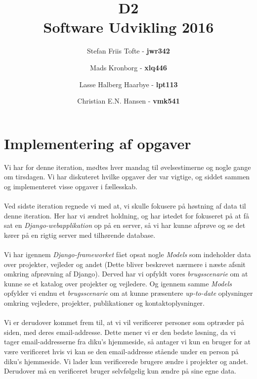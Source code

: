 \documentclass[11pt]{article}
\title{
  \vspace{3cm}
  \Huge{D2} \\
  \Large{Software Udvikling 2016}
}
\author{
	\Large{Stefan Friis Tofte} - \textbf{jwr342}%
	\and
	\Large{Mads Kronborg} - \textbf{xlq446}%
	\and
	\Large{Lasse Halberg Haarbye} - \textbf{lpt113}%
	\and
	\Large{Christian E.N. Hansen} - \textbf{vmk541}%
}
\def \ColourPDF {../include/ku-farve}
\def \TitlePDF {../include/ku-en}  %
\begin{document}


\clearpage\maketitle
\thispagestyle{empty}

\newpage
\tableofcontents
\newpage

\section{Implementering af opgaver}
Vi har for denne iteration, mødtes hver mandag til øvelsestimerne og nogle gange om tirsdagen. Vi har diskuteret hvilke opgaver der var vigtige, og siddet sammen og implementeret visse opgaver i fællesskab. \\ \\
Ved sidste iteration regnede vi med at, vi skulle fokusere på høstning af data til denne iteration. Her har vi ændret holdning, og har istedet for fokuseret på at få sat en \textit{Django-webapplikation} op på en server, så vi har kunne afprøve og se det kører på en rigtig server med tilhørende database. \\ \\
Vi har igennem \textit{Django-frameworket} fået opsat nogle \textit{Models} som indeholder data over projekter, vejleder og andet (Dette bliver beskrevet nærmere i  næste afsnit omkring afprøvning af Django).
Derved har vi opfyldt vores \textit{brugsscenarie} om at kunne se et katalog over projekter og vejledere. Og igennem samme \textit{Models} opfylder vi endnu et \textit{brugsscenarie} om at kunne præsentere \textit{up-to-date} oplysninger omkring vejledere, projekter, publikationer og kontaktoplysninger. \\ \\
Vi er derudover kommet frem til, at vi vil verificerer personer som optræder på siden, med deres email-addresse. Dette mener vi er den bedste løsning, da vi tager email-addresserne fra diku's hjemmeside, så antager vi kun en bruger for at være verificeret hvis vi kan se den email-addresse stående under en person på diku's hjemmeside. Vi lader kun verificerede brugere ændre i projekter og andet. Derudover må en verificeret bruger selvfølgelig kun ændre på sine egne data.
\end{document}
